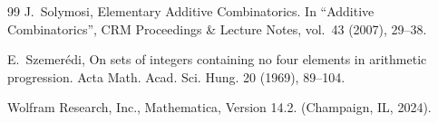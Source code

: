 \documentclass[10pt]{amsart}
\theoremstyle{plain}
\begin{document}
\begin{thebibliography}{99}
J.~Solymosi, Elementary Additive Combinatorics. 
In ``Additive Combinatorics'', CRM Proceedings \& Lecture Notes,
vol.~43 (2007), 29--38.

E.~Szemer\'{e}di,
On sets of integers containing no four elements in arithmetic progression.
Acta Math. Acad. Sci. Hung. 20 (1969), 89--104. 



 Wolfram Research, Inc., Mathematica, Version 14.2. (Champaign, IL, 2024).



\end{thebibliography}
\end{document}

